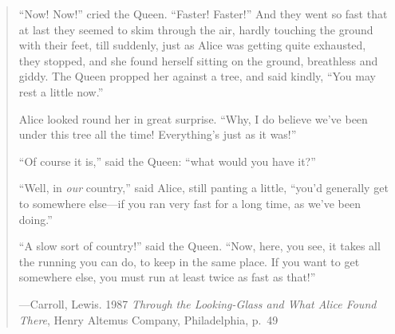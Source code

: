 

\cleardoublepage{}

\thispagestyle{empty} %

\vspace*{50 mm}

\small{}

\begin{quote}
	``Now! Now!'' cried the Queen. 
	``Faster! Faster!'' 
	And they went so fast that at last they seemed to skim through the air, 
	hardly touching the ground with their feet, 
	till suddenly, 
	just as Alice was getting quite exhausted, 
	they stopped, 
	and she found herself sitting on the ground, 
	breathless and giddy. 
	The Queen propped her against a tree, and said kindly, 
	``You may rest a little now.''

	Alice looked round her in great surprise. 
	``Why, I do believe we've been under this tree all the time! 
	Everything's just as it was!''

	``Of course it is,'' said the Queen: ``what would you have it?''

	``Well, in \emph{our} country,'' said Alice, still panting a little, 
	``you'd generally get to somewhere else---if you ran very fast for a long time, 
	as we've been doing.''

	``A slow sort of country!'' said the Queen. 
	``Now, here, you see, it takes all the running you can do, to keep in the same place. 
	If you want to get somewhere else, you must run at least twice as fast as that!''

	\hfill---Carroll, Lewis. 1987 \emph{Through the Looking-Glass and What Alice Found There},
	Henry Altemus Company, Philadelphia, p.~49
\end{quote}

\normalsize{}


